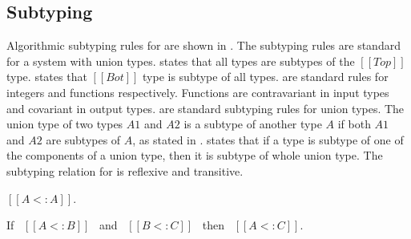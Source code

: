 \subsection{Subtyping}
\label{sec:union:sub}
Algorithmic subtyping rules for \cal are shown in
. The subtyping rules are standard for a system
with union types.   states that all types are subtypes of
the $[[Top]]$ type.  states that $[[Bot]]$ type is subtype of
all types.  are standard rules for integers and
functions respectively.  Functions are contravariant in input types
and covariant in output types.  are standard
subtyping rules for union types. The union type of two types $A1$ and $A2$
is a subtype of another type $A$ if both $A1$ and $A2$ are subtypes of
$A$, as stated in .  states that if a
type is subtype of one of the components of a union type, then it is subtype of whole
union type.  The subtyping relation for \cal is reflexive and transitive.
\begin{lemma}
  $[[A <: A]]$.
\label{lemma:union:refl}
\end{lemma}
\begin{comment}
\begin{proof}
  By induction on type A. All cases are trivial to prove.
\end{proof}
\end{comment}
\begin{lemma}
  If \ $[[A <: B]]$ \ and \ $[[B <: C]]$ \ then \ $[[A <: C]]$.
  \label{lemma:union:trans}
\end{lemma}
\begin{comment}
\begin{proof}
  By induction on type B.
  \begin{itemize}
    \item Cases $[[Top]]$, $[[Bot]]$ and $[[Int]]$ are trivial to prove.
    \item Case $[[A -> B]]$ requires double induction on type $[[C]]$
          and $[[A]]$.
    \item Case $[[A \/ B]]$ requires \Cref{lemma:union:sub-or}
  \end{itemize}
\end{proof}\bruno{If space is a concern we can probably drop the lemma statements
for reflexivity and transitivity as these are quite standard.}

\begin{lemma}[Subtyping Union Inversion]
\label{lemma:union:sub-or}
  If \ $[[A \/ B <: C]]$ then:
  \begin{enumerate}
    \item $[[A <: C]]$ and
    \item $[[B <: C]]$
  \end{enumerate}
\end{lemma}
\end{comment}


